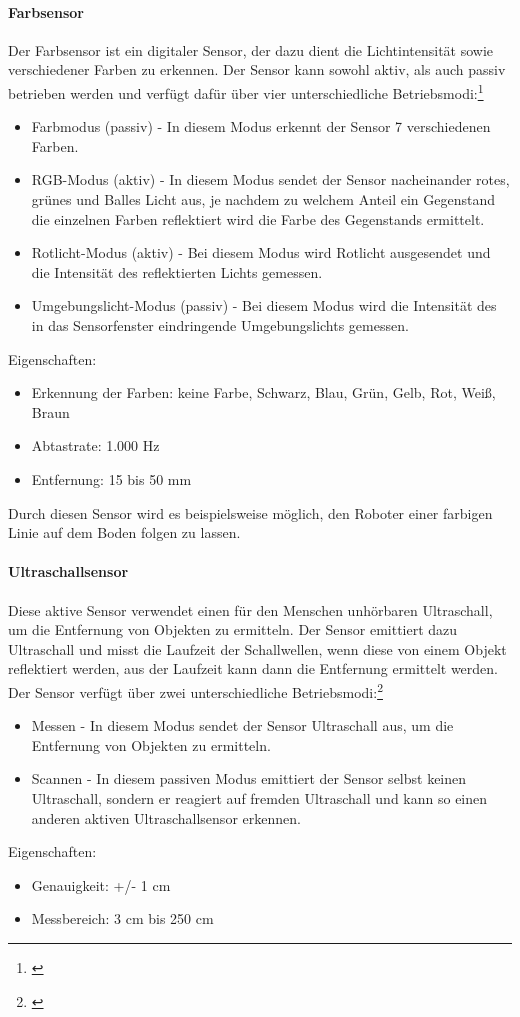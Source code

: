 \paragraph{Farbsensor}
Der Farbsensor ist ein digitaler Sensor, der dazu dient die Lichtintensität sowie verschiedener Farben zu erkennen. Der Sensor kann sowohl
aktiv, als auch passiv betrieben werden und verfügt dafür über vier unterschiedliche Betriebsmodi:\footnote{\citep[vgl.][EV3-Programmieren mit Java, Seite 101]{Schobel.RobertaEV3Programmieren}\label{note29}}
\begin{itemize}
	\item{Farbmodus (passiv)} - In diesem Modus erkennt der Sensor 7 verschiedenen Farben.
	\item{RGB-Modus (aktiv)} - In diesem Modus sendet der Sensor nacheinander rotes, grünes und Balles Licht aus, je nachdem zu welchem Anteil ein Gegenstand die einzelnen Farben reflektiert wird die Farbe des Gegenstands ermittelt.
	\item{Rotlicht-Modus (aktiv)} - Bei diesem Modus wird Rotlicht ausgesendet und die Intensität des reflektierten Lichts gemessen.
	\item{Umgebungslicht-Modus (passiv)} - Bei diesem Modus wird die Intensität des in das Sensorfenster eindringende Umgebungslichts gemessen.
\end{itemize}
\smallskip
Eigenschaften:
\begin{itemize}
	\item{Erkennung der Farben:} keine Farbe, Schwarz, Blau, Grün, Gelb, Rot, Weiß, Braun
	\item{Abtastrate:} 1.000 Hz
	\item{Entfernung:} 15 bis 50 mm
\end{itemize}
Durch diesen Sensor wird es beispielsweise möglich, den Roboter einer farbigen Linie auf dem Boden folgen zu lassen.
\paragraph{Ultraschallsensor}
Diese aktive Sensor verwendet einen für den Menschen unhörbaren Ultraschall, um die Entfernung von Objekten zu ermitteln. Der Sensor emittiert dazu Ultraschall und misst die Laufzeit der Schallwellen, wenn diese von einem Objekt reflektiert werden, aus der Laufzeit kann dann die Entfernung ermittelt werden. Der Sensor verfügt über zwei unterschiedliche Betriebsmodi:\footnote{\citep[vgl.][Das EV3 Roboter Universum, Seite 32 f.]{Scholz.DasEV3}\label{note30}}
\begin{itemize}
	\item{Messen} - In diesem Modus sendet der Sensor Ultraschall aus, um die Entfernung von Objekten zu ermitteln.
	\item{Scannen} - In diesem passiven Modus emittiert der Sensor selbst keinen Ultraschall, sondern er reagiert auf fremden Ultraschall und kann so einen anderen aktiven Ultraschallsensor erkennen.
\end{itemize}
\smallskip
Eigenschaften:
\begin{itemize}
	\item{Genauigkeit: +/- 1 cm}
	\item{Messbereich: 3 cm bis 250 cm}
\end{itemize}
